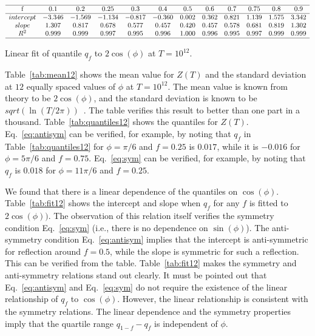 \documentclass[twoside]{article}
\begin{document}
\begin{table}
\centering \(\begin{array}{cccccccccccc}
\hline
$f$&0.1&0.2&0.25&0.3&0.4&0.5&0.6&0.7&0.75&0.8&0.9\\
\hline
intercept&-3.346&-1.569&-1.134&-0.817&-0.360&0.002&0.362&0.821&1.139&1.575&3.342\\
slope&1.307&0.817&0.678&0.577&0.457&0.420&0.457&0.578&0.681&0.819&1.302\\
R^2&0.999&0.999&0.997&0.995&0.996&1.000&0.996&0.995&0.997&0.999&0.999\\
\hline
\end{array}\)
\caption{Linear fit of quantile $q_f$ to $2\cos(\phi)$ at $T=10^{12}$.}
\label{tab:fit12}
\end{table}

Table~\ref{tab:mean12} shows the mean value for $Z(T)$ and the standard deviation at $12$ equally spaced values 
of $\phi$ at $T=10^{12}$. 
The mean value is known from theory to be $2\cos(\phi)$, and the standard deviation is known 
to be $sqrt(\ln(T/2\pi))$~\cite{Shanker 2018b}. The table verifies this result to better 
than one part in a thousand. Table~\ref{tab:quantiles12} shows the quantiles for $Z(T)$. 
Eq.~\ref{eq:antisym} can be verified, for example, by noting that $q_f$ in Table~\ref{tab:quantiles12}
for $\phi=\pi/6$ and $f=0.25$ is $0.017$, while it is $-0.016$ for $\phi=5\pi/6$ and $f=0.75$. 
Eq.~\ref{eq:sym} can be verified, for example, by noting that $q_f$ is $0.018$ for $\phi=11\pi/6$ and $f=0.25$.

We found that there is a linear dependence of the quantiles on $\cos(\phi)$. 
Table~\ref{tab:fit12} shows the intercept and slope when $q_f$ for any $f$ is fitted to
$2\cos(\phi))$. The observation of this relation itself verifies the symmetry condition 
Eq.~\ref{eq:sym} (i.e., there is no dependence on $\sin(\phi)$). 
The anti-symmetry condition Eq.~\ref{eq:antisym} implies that the intercept is anti-symmetric 
for reflection around $f=0.5$, while the slope is symmetric for such a reflection. This can be verified from the table. Table~\ref{tab:fit12} makes the symmetry and anti-symmetry relations stand out clearly.  It must be pointed out that Eq.~\ref{eq:antisym} and Eq.~\ref{eq:sym} do not require the
existence of the linear relationship of $q_f$ to $\cos(\phi)$. However, the linear relationship is consistent with the symmetry relations.
The linear dependence and the symmetry properties imply that the quartile range $q_{1-f}-q_f$ is independent of $\phi$.
\end{document}
